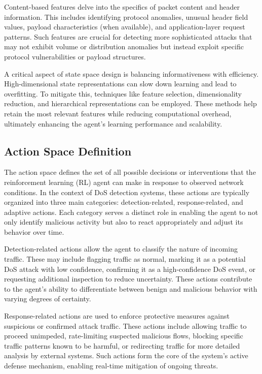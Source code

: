 \documentclass[12pt]{report}
\begin{document}
Content-based features delve into the specifics of packet content and header information. This includes identifying protocol anomalies, unusual header field values, payload characteristics (when available), and application-layer request patterns. Such features are crucial for detecting more sophisticated attacks that may not exhibit volume or distribution anomalies but instead exploit specific protocol vulnerabilities or payload structures.

A critical aspect of state space design is balancing informativeness with efficiency. High-dimensional state representations can slow down learning and lead to overfitting. To mitigate this, techniques like feature selection, dimensionality reduction, and hierarchical representations can be employed. These methods help retain the most relevant features while reducing computational overhead, ultimately enhancing the agent’s learning performance and scalability.

\subsection{Action Space Definition}

The action space defines the set of all possible decisions or interventions that the reinforcement learning (RL) agent can make in response to observed network conditions. In the context of DoS detection systems, these actions are typically organized into three main categories: detection-related, response-related, and adaptive actions. Each category serves a distinct role in enabling the agent to not only identify malicious activity but also to react appropriately and adjust its behavior over time.

Detection-related actions allow the agent to classify the nature of incoming traffic. These may include flagging traffic as normal, marking it as a potential DoS attack with low confidence, confirming it as a high-confidence DoS event, or requesting additional inspection to reduce uncertainty. These actions contribute to the agent’s ability to differentiate between benign and malicious behavior with varying degrees of certainty.

Response-related actions are used to enforce protective measures against suspicious or confirmed attack traffic. These actions include allowing traffic to proceed unimpeded, rate-limiting suspected malicious flows, blocking specific traffic patterns known to be harmful, or redirecting traffic for more detailed analysis by external systems. Such actions form the core of the system's active defense mechanism, enabling real-time mitigation of ongoing threats.
\end{document}
